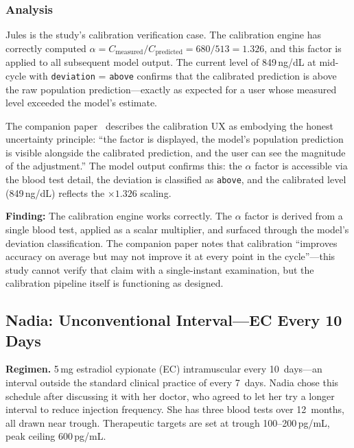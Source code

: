 \documentclass[11pt,a4paper]{article}
\newcommand{\code}[1]{\texttt{\small #1}}
\begin{document}
\subsubsection{Analysis}

Jules is the study's calibration verification case. The calibration engine
has correctly computed $\alpha = C_{\text{measured}} / C_{\text{predicted}}
= 680 / 513 = 1.326$, and this factor is applied to all subsequent model
output. The current level of 849\,ng/dL at mid-cycle with
\code{deviation} = \code{above} confirms that the calibrated prediction is
above the raw population prediction---exactly as expected for a user whose
measured level exceeded the model's estimate.

The companion paper~\cite{xtux} describes the calibration UX as embodying
the honest uncertainty principle: ``the factor is displayed, the model's
population prediction is visible alongside the calibrated prediction, and
the user can see the magnitude of the adjustment.'' The model output
confirms this: the $\alpha$ factor is accessible via the blood test detail,
the deviation is classified as \code{above}, and the calibrated level
(849\,ng/dL) reflects the $\times 1.326$ scaling.

\textbf{Finding:} The calibration engine works correctly. The $\alpha$
factor is derived from a single blood test, applied as a scalar multiplier,
and surfaced through the model's deviation classification. The companion
paper notes that calibration ``improves accuracy on average but may not
improve it at every point in the cycle''---this study cannot verify that
claim with a single-instant examination, but the calibration pipeline
itself is functioning as designed.

\subsection{Nadia: Unconventional Interval---EC Every 10 Days}
\label{sec:nadia}

\textbf{Regimen.} 5\,mg estradiol cypionate (EC) intramuscular every
10~days---an interval outside the standard clinical practice of every
7~days. Nadia chose this schedule after discussing it with her doctor, who
agreed to let her try a longer interval to reduce injection frequency. She
has three blood tests over 12~months, all drawn near trough. Therapeutic
targets are set at trough 100--200\,pg/mL, peak ceiling 600\,pg/mL.
\end{document}
